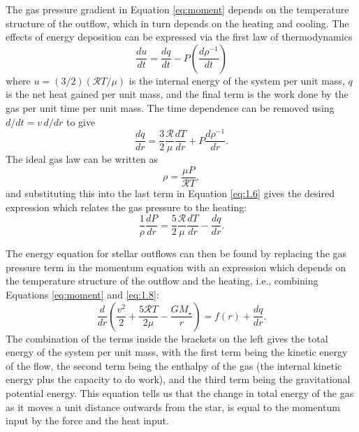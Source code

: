 The gas pressure gradient in Equation \ref{eq:moment} depends on the temperature structure of the outflow, which in turn depends on the heating and cooling. The effects of energy deposition can be expressed via the first law of thermodynamics 
\begin{equation}
\frac{du}{dt}=\frac{dq}{dt}-P\left(\frac{d\rho ^{-1}}{dt} \right)
\end{equation}
where $u=(3/2)(\mathcal{R}T/\mu)$ is the internal energy of the system per unit mass, $q$ is the net heat gained per unit mass, and the final term is the work done by the gas per unit time per unit mass. The time dependence can be removed using $d/dt=v\,d/dr$ to give
\begin{equation}\label{eq:1.6}
\frac{dq}{dr}=\frac{3}{2}\frac{\mathcal{R}}{\mu}\frac{dT}{dr}+P\frac{d\rho ^{-1}}{dr}.
\end{equation}
The ideal gas law can be written as 
\begin{equation}
\rho = \frac{\mu P}{\mathcal{R}T},
\end{equation}
and substituting this into the last term in Equation \ref{eq:1.6} gives the desired expression which relates the gas pressure to the heating:
\begin{equation}\label{eq:1.8}
\frac{1}{\rho}\dfrac{dP}{dr}=\dfrac{5}{2}\dfrac{\mathcal{R}}{\mu}\dfrac{dT}{dr}-\frac{dq}{dr}.
\end{equation}

The energy equation for stellar outflows can then be found by replacing the gas pressure term in the momentum equation with an expression which depends on the temperature structure of the outflow and the heating, i.e., combining Equations \ref{eq:moment} and \ref{eq:1.8}:
\begin{equation}\label{eq:1.9a}
\frac{d}{dr}\left(\frac{v^2}{2} + \frac{5\mathcal{R}T}{2\mu}-\frac{GM_{\star}}{r}\right)= f(r)+\frac{dq}{dr}.
\end{equation}
The combination of the terms inside the brackets on the left gives the total energy of the system per unit mass, with the first term being the kinetic energy of the flow, the second term being the enthalpy of the gas (the internal kinetic energy plus the capacity to do work), and the third term being the gravitational potential energy.  This equation tells us that the change in total energy of the gas as it moves a unit distance outwards from the star, is equal to the momentum input by the force and the heat input.

